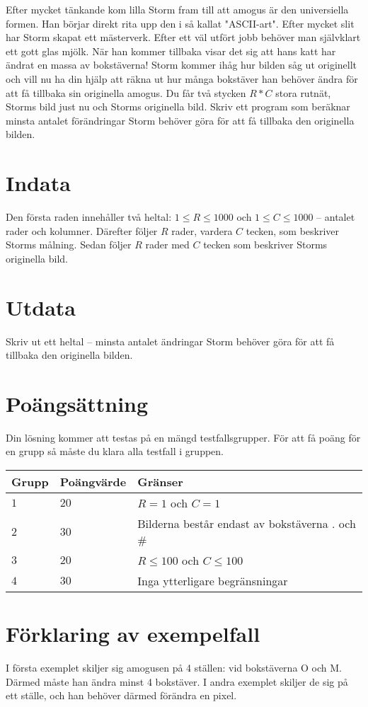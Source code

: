 Efter mycket tänkande kom lilla Storm fram till att amogus är den universiella formen. Han börjar direkt rita upp den
i så kallat "ASCII-art". Efter mycket slit har Storm skapat ett mästerverk. Efter ett väl utfört jobb behöver man
självklart ett gott glas mjölk. När han kommer tillbaka visar det sig att hans katt har ändrat en massa av bokstäverna!
Storm kommer ihåg hur bilden såg ut originellt och vill nu ha din hjälp att räkna ut hur många bokstäver han behöver ändra
för att få tillbaka sin originella amogus.
Du får två stycken $R*C$ stora rutnät, Storms bild just nu och Storms originella bild. Skriv ett program som beräknar
minsta antalet förändringar Storm behöver göra för att få tillbaka den originella bilden.

\section*{Indata}
Den första raden innehåller två heltal: $1\leq R \leq 1000$ och $1 \leq C \leq 1000$ -- antalet rader och kolumner.
Därefter följer $R$ rader, vardera $C$ tecken, som beskriver Storms målning. 
Sedan följer $R$ rader med $C$ tecken som beskriver Storms originella bild. 

\section*{Utdata}
Skriv ut ett heltal -- minsta antalet ändringar Storm behöver göra för att få tillbaka den originella bilden.

\section*{Poängsättning}
Din lösning kommer att testas på en mängd testfallsgrupper.
För att få poäng för en grupp så måste du klara alla testfall i gruppen.

\noindent
\begin{tabular}{| l | l | p{12cm} |}
  \hline
  Grupp & Poängvärde & Gränser \\ \hline
  $1$   & $20$       & $R=1$ och $C=1$ \\ \hline
  $2$   & $30$       & Bilderna består endast av bokstäverna . och \#\\ \hline
  $3$   & $20$       & $R \leq 100$ och $C \leq 100$  \\ \hline
  $4$   & $30$       & Inga ytterligare begränsningar  \\ \hline
\end{tabular}

\section*{Förklaring av exempelfall}
I första exemplet skiljer sig amogusen på 4 ställen: vid bokstäverna O och M. Därmed måste han ändra minst 4 bokstäver.
I andra exemplet skiljer de sig på ett ställe, och han behöver därmed förändra en pixel.